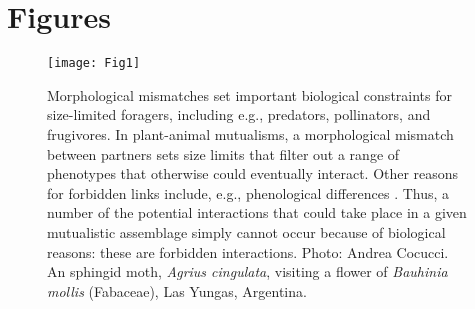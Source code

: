 \documentclass[a4paper,12pt]{article}
\begin{document}
\section*{Figures}


\begin{figure}[h!]
  \caption{Morphological mismatches set important biological constraints for size-limited foragers, including e.g., predators, pollinators, and frugivores. In plant-animal mutualisms, a morphological mismatch between partners sets size limits that filter out a range of phenotypes that otherwise could eventually interact. Other reasons for forbidden links include, e.g., phenological differences \citep{BasJor:2014}. Thus, a number of the potential interactions that could take place in a given mutualistic assemblage simply cannot occur because of biological reasons: these are forbidden interactions. Photo: Andrea Cocucci. An sphingid moth, \textit{Agrius cingulata}, visiting a flower of \textit{Bauhinia mollis} (Fabaceae), Las Yungas, Argentina.}
  \label{Fig1}
  \begin{center}
    \texttt{[image: Fig1]}
  \end{center}
\end{figure}
\begin{comment}
\bibitem{Borrell:2005}
Borrell, B. (2005) Long tongues and loose niches: Evolution of euglossine bees and their nectar flowers. Biotropica, 37, 664–669.

\bibitem{More:2012}
Mor\'e, M., Amorim, F.W., Benitez-Vieyra, S., Medina, A.M., Sazima, M. \& Cocucci, A.A. (2012) Armament imbalances: match and mismatch in plant-pollinator traits of highly specialized long-spurred orchids. PLoS ONE, 7, e41878. 


\end{comment}
\end{document}
